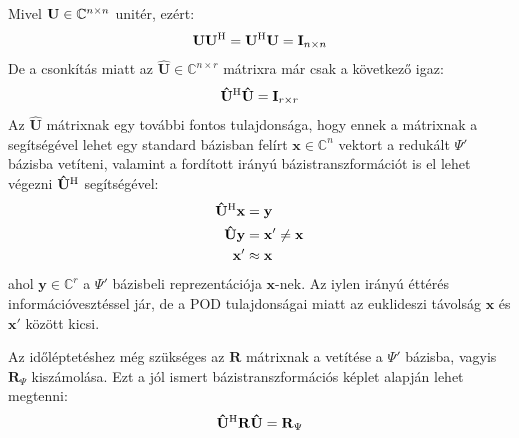             \par
            Mivel ${\bf U} \in \mathbb{C}^{n \times n}$ unitér, ezért:
            \begin{equation}
                \begin{aligned}
                    \mathbf{U}\mathbf{U}^{\mathrm{H}} = \mathbf{U}^{\mathrm{H}}\mathbf{U} = \mathbf{I}_{n\times n}
                \end{aligned}
            \end{equation}
            De a csonkítás miatt az $\mathbf{\hat{U}} \in \mathbb{C}^{n \times r}$ mátrixra már csak a következő igaz:
            \begin{equation}
                \begin{aligned}
                    \mathbf{\hat{U}}^{\mathrm{H}}\mathbf{\hat{U}} = \mathbf{I}_{r\times r}
                \end{aligned}
            \end{equation}
            Az $\mathbf{\hat{U}}$ mátrixnak egy további fontos tulajdonsága, hogy ennek a mátrixnak a segítségével lehet egy standard bázisban felírt $\mathbf{x} \in \mathbb{C}^{n}$ vektort a redukált $\Psi'$ bázisba vetíteni, valamint a fordított irányú bázistranszformációt is el lehet végezni $\mathbf{\hat{U}}^{\mathrm{H}}$ segítségével:
            \begin{equation}
                \begin{aligned}
                    \mathbf{\hat{U}}^{\mathrm{H}}\mathbf{x} &= \mathbf{y}\\
                    \mathbf{\hat{U}}\mathbf{y} &= \mathbf{x'} \ne \mathbf{x}\\
                    \mathbf{x'} &\approx \mathbf{x}
                \end{aligned}
            \end{equation}
            ahol $\mathbf{y} \in \mathbb{C}^{r}$ a $\Psi'$ bázisbeli reprezentációja $\mathbf{x}$-nek. Az iylen irányú éttérés információvesztéssel jár, de a POD tulajdonságai miatt az euklideszi távolság $\mathbf{x}$ és $\mathbf{x'}$ között kicsi.
            \par
            Az időléptetéshez még szükséges az $\mathbf{R}$ mátrixnak a vetítése a $\Psi'$ bázisba, vagyis $\mathbf{R}_{\Psi}$ kiszámolása. Ezt a jól ismert bázistranszformációs képlet alapján lehet megtenni:
            \begin{equation}
                \mathbf{\hat{U}}^{\mathrm{H}}\mathbf{R}\mathbf{\hat{U}} = \mathbf{R}_{\Psi}
            \end{equation}
